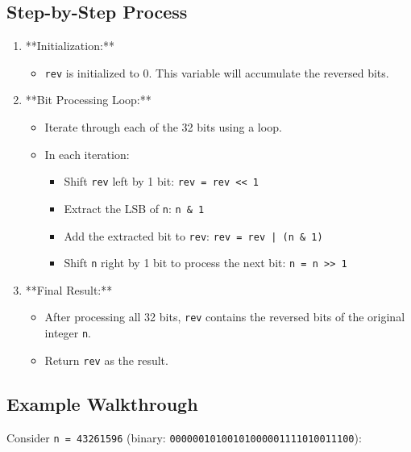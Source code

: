 \subsection*{Step-by-Step Process}

\begin{enumerate}
    \item **Initialization:**
    \begin{itemize}
        \item \texttt{rev} is initialized to 0. This variable will accumulate the reversed bits.
    \end{itemize}
    
    \item **Bit Processing Loop:**
    \begin{itemize}
        \item Iterate through each of the 32 bits using a loop.
        \item In each iteration:
        \begin{itemize}
            \item Shift \texttt{rev} left by 1 bit: \texttt{rev = rev << 1}
            \item Extract the LSB of \texttt{n}: \texttt{n \& 1}
            \item Add the extracted bit to \texttt{rev}: \texttt{rev = rev | (n \& 1)}
            \item Shift \texttt{n} right by 1 bit to process the next bit: \texttt{n = n >> 1}
        \end{itemize}
    \end{itemize}
    
    \item **Final Result:**
    \begin{itemize}
        \item After processing all 32 bits, \texttt{rev} contains the reversed bits of the original integer \texttt{n}.
        \item Return \texttt{rev} as the result.
    \end{itemize}
\end{enumerate}

\subsection*{Example Walkthrough}

Consider \texttt{n = 43261596} (binary: \texttt{00000010100101000001111010011100}):


